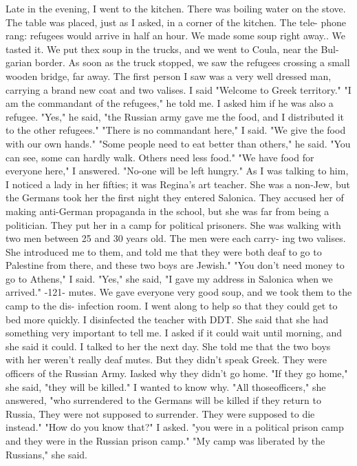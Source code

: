 Late in the evening, I went to the kitchen.
There was boiling water on the 
stove.
The table was placed, just as I asked, in a corner of the kitchen.
The tele-
phone rang: refugees would arrive in half an hour.
We made some soup right away.. 
We tasted it.
We put thex soup in the trucks, and we went to Coula, near the Bul-
garian border.
As soon as the truck stopped, we saw the refugees crossing a small wooden bridge, 
far away.
The first person I saw was a very well dressed man, carrying a brand new 
coat and two valises.
I said "Welcome to Greek territory."
"I am the commandant of the refugees," he told me.
I asked him if he was also a 
refugee.
"Yes," he said, "the Russian army gave me the food, and I distributed it to 
the other refugees."
"There is no commandant here," I said.
"We give the food with our own hands."
"Some people need to eat better than others," he said.
"You can see, some can 
hardly walk.
Others need less food."
"We have food for everyone here," I answered.
"No-one will be left hungry."
As I was talking to him, I noticed a lady in her fifties; it was Regina's art 
teacher.
She was a non-Jew, but the Germans took her the first night they entered 
Salonica.
They accused her of making anti-German propaganda in the school, but she 
was far from being a politician.
They put her in a camp for political prisoners.
She was walking with two men between 25 and 30 years old.
The men were each carry-
ing two valises.
She introduced me to them, and told me that they were both deaf 
to go to Palestine from there, and these two boys are Jewish."
"You don't need money to go to Athens," I said.
"Yes," she said, "I gave my address in Salonica when we arrived."
-121- 
mutes.
We gave everyone very good soup, and we took them to the camp to the dis-
infection room.
I went along to help so that they could get to bed more quickly.
I disinfected the teacher with DDT.
She said that she had something very important 
to tell me.
I asked if it could wait until morning, and she said it could.
I talked to her the next day.
She told me that the two boys with her weren't 
really deaf mutes.
But they didn't speak Greek.
They were officers of the Russian 
Army.
Iasked why they didn't go home.
"If they go home," she said, "they will be killed."
I wanted to know why.
"All 
thoseofficers," she answered, "who surrendered to the Germans will be killed if they 
return to Russia, They were not supposed to surrender.
They were supposed to die 
instead."
"How do you know that?"
I asked.
"you were in a political prison camp and they 
were in the Russian prison camp."
"My camp was liberated by the Russians," she said.
